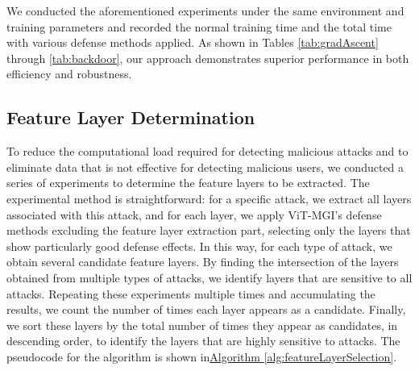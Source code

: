 \documentclass[conference]{IEEEtran}
\begin{document}
We conducted the aforementioned experiments under the same environment and training parameters and recorded the normal training time and the total time with various defense methods applied. As shown in Tables \hyperref[tab:gradAscent]{\ref{tab:gradAscent}} through \hyperref[tab:backdoor]{\ref{tab:backdoor}}, our approach demonstrates superior performance in both efficiency and robustness.

\subsection{Feature Layer Determination}
\label{exp:exp_layer}


To reduce the computational load required for detecting malicious attacks and to eliminate data that is not effective for detecting malicious users, we conducted a series of experiments to determine the feature layers to be extracted. The experimental method is straightforward: for a specific attack, we extract all layers associated with this attack, and for each layer, we apply ViT-MGI's defense methods excluding the feature layer extraction part, selecting only the layers that show particularly good defense effects. In this way, for each type of attack, we obtain several candidate feature layers. By finding the intersection of the layers obtained from multiple types of attacks, we identify layers that are sensitive to all attacks. Repeating these experiments multiple times and accumulating the results, we count the number of times each layer appears as a candidate. Finally, we sort these layers by the total number of times they appear as candidates, in descending order, to identify the layers that are highly sensitive to attacks. The pseudocode for the algorithm is shown in\hyperref[alg:featureLayerSelection]{Algorithm \ref{alg:featureLayerSelection}}.
\end{document}
